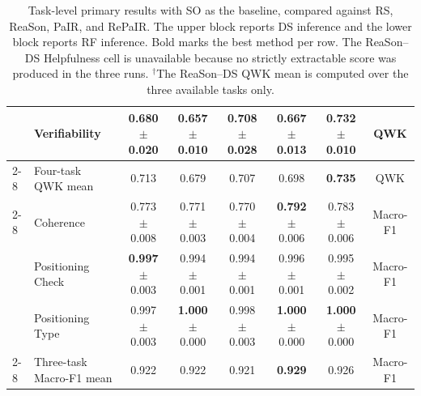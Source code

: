 \begin{table}[t]
\begin{tabular}{@{}llcccccc@{}}
& Verifiability & 0.680 $\pm$ 0.020 & 0.657 $\pm$ 0.010 & 0.708 $\pm$ 0.028 & 0.667 $\pm$ 0.013 & \textbf{0.732} $\pm$ 0.010 & QWK \\
\cmidrule(lr){2-8}
& Four-task QWK mean & 0.713 & 0.679 & 0.707 & 0.698 & \textbf{0.735} & QWK \\
\cmidrule(lr){2-8}
& Coherence & 0.773 $\pm$ 0.008 & 0.771 $\pm$ 0.003 & 0.770 $\pm$ 0.004 & \textbf{0.792} $\pm$ 0.006 & 0.783 $\pm$ 0.006 & Macro-F1 \\
& Positioning Check & \textbf{0.997} $\pm$ 0.003 & 0.994 $\pm$ 0.001 & 0.994 $\pm$ 0.001 & 0.996 $\pm$ 0.001 & 0.995 $\pm$ 0.002 & Macro-F1 \\
& Positioning Type & 0.997 $\pm$ 0.003 & \textbf{1.000} $\pm$ 0.000 & 0.998 $\pm$ 0.003 & \textbf{1.000} $\pm$ 0.000 & \textbf{1.000} $\pm$ 0.000 & Macro-F1 \\
\cmidrule(lr){2-8}
& Three-task Macro-F1 mean & 0.922 & 0.922 & 0.921 & \textbf{0.929} & 0.926 & Macro-F1 \\
\bottomrule
\end{tabular}
\caption{Task-level primary results with SO as the baseline, compared against RS, ReaSon, PaIR, and RePaIR. The upper block reports DS inference and the lower block reports RF inference. Bold marks the best method per row. The ReaSon--DS Helpfulness cell is unavailable because no strictly extractable score was produced in the three runs. $^{\dagger}$The ReaSon--DS QWK mean is computed over the three available tasks only.}
\label{tab:full-method-task-level}
\end{table}

